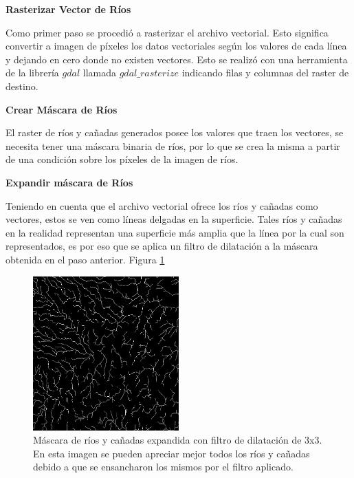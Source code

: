 \documentclass[10pt,a4paper, twoside]{report}
\begin{document}
\textbf{Rasterizar Vector de Ríos}

Como primer paso se procedió a rasterizar el archivo vectorial. Esto significa convertir a imagen de píxeles los datos vectoriales según los valores de cada línea y dejando en cero donde no existen vectores. Esto se realizó con una herramienta de la librería $gdal$ llamada $gdal\_rasterize$ indicando filas y columnas del raster de destino.



\textbf{Crear Máscara de Ríos}

El raster de ríos y cañadas generados posee los valores que traen los vectores, se necesita tener una máscara binaria de ríos, por lo que se crea la misma a partir de una condición sobre los píxeles de la imagen de ríos. %


\textbf{Expandir máscara de Ríos}

Teniendo en cuenta que el archivo vectorial ofrece los ríos y cañadas como vectores, estos se ven como líneas delgadas en la superficie. Tales ríos y cañadas en la realidad representan una superficie más amplia que la línea por la cual son representados, es por eso que se aplica un filtro de dilatación a la máscara obtenida en el paso anterior. Figura \ref{riosExpandidos}

\begin{figure}[H]
   \centering      
   \includegraphics[width=0.5\textwidth]{imagenes/riosExpandidos.jpg}
 \caption{Máscara de ríos y cañadas expandida con filtro de dilatación de 3x3. En esta imagen se pueden apreciar mejor todos los ríos y cañadas debido a que se ensancharon los mismos por el filtro aplicado.}
 \label{riosExpandidos}
\end{figure}
\end{document}
